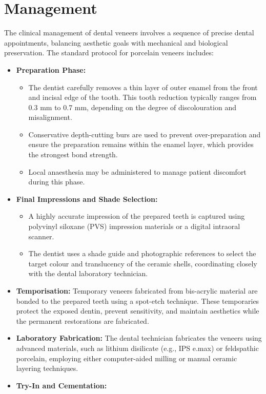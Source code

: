 \section*{Management}
The clinical management of dental veneers involves a sequence of precise dental appointments, balancing aesthetic goals with mechanical and biological preservation. The standard protocol for porcelain veneers includes:
\begin{itemize}
    \item \textbf{Preparation Phase:}
    \begin{itemize}
        \item The dentist carefully removes a thin layer of outer enamel from the front and incisal edge of the tooth. This tooth reduction typically ranges from 0.3 mm to 0.7 mm, depending on the degree of discolouration and misalignment.
        \item Conservative depth-cutting burs are used to prevent over-preparation and ensure the preparation remains within the enamel layer, which provides the strongest bond strength.
        \item Local anaesthesia may be administered to manage patient discomfort during this phase.
    \end{itemize}
    \item \textbf{Final Impressions and Shade Selection:}
    \begin{itemize}
        \item A highly accurate impression of the prepared teeth is captured using polyvinyl siloxane (PVS) impression materials or a digital intraoral scanner.
        \item The dentist uses a shade guide and photographic references to select the target colour and translucency of the ceramic shells, coordinating closely with the dental laboratory technician.
    \end{itemize}
    \item \textbf{Temporisation:} Temporary veneers fabricated from bis-acrylic material are bonded to the prepared teeth using a spot-etch technique. These temporaries protect the exposed dentin, prevent sensitivity, and maintain aesthetics while the permanent restorations are fabricated.
    \item \textbf{Laboratory Fabrication:} The dental technician fabricates the veneers using advanced materials, such as lithium disilicate (e.g., IPS e.max) or feldspathic porcelain, employing either computer-aided milling or manual ceramic layering techniques.
    \item \textbf{Try-In and Cementation:}

\end{itemize}
